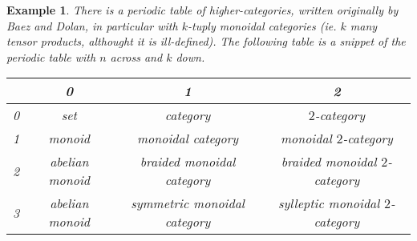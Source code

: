 \documentclass[12pt,a4paper]{article}
\newtheorem{example}[theorem]{Example}
\begin{document}
\begin{example}
    There is a periodic table of higher-categories, written originally by Baez and Dolan, in particular with $k$-tuply monoidal categories (ie. $k$ many tensor products, althought it is ill-defined). The following table is a snippet of the periodic table with $n$ across and $k$ down.
    \begin{center}
    \begin{tabular} {|c | c | c | c|}
        \hline
        & 0 & 1 & 2\\
        \hline
        0 & set & category & $2$-category\\
        \hline
        1 & monoid & monoidal category & monoidal $2$-category\\
        \hline
        2 & abelian monoid & braided monoidal category & braided monoidal $2$-category\\
        \hline
        3 & abelian monoid & symmetric monoidal category & sylleptic monoidal $2$-category\\
        \hline
    \end{tabular}
    \end{center}
\end{example}
\end{document}
